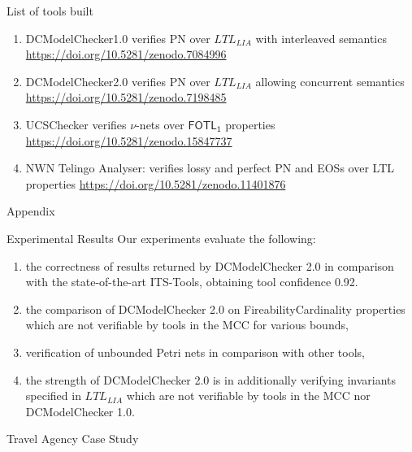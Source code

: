\documentclass [serif,professionalfont]{beamer}
\newcommand{\LC}{$LTL_{LIA}$}
\newcommand{\Lstar}{$\mathsf{FOTL_1}$}
\begin{document}
\begin{frame}{List of tools built}
    \begin{enumerate}
        \item[1] DCModelChecker1.0 verifies PN over {\LC} with interleaved semantics \url{https://doi.org/10.5281/zenodo.7084996}
        \item[2] DCModelChecker2.0 verifies PN over {\LC} allowing concurrent semantics \url{https://doi.org/10.5281/zenodo.7198485}
        \item[3] UCSChecker verifies $\nu$-nets over {\Lstar} properties \url{https://doi.org/10.5281/zenodo.15847737}
        \item[4] NWN Telingo Analyser: verifies lossy and perfect PN and EOSs over LTL properties \url{https://doi.org/10.5281/zenodo.11401876}
    \end{enumerate}

\end{frame}
\appendix
\begin{frame}
    \centering
    \huge{Appendix}
\end{frame}

\begin{frame}{Experimental Results}
    Our experiments evaluate the following:
    \begin{enumerate}
        \item  the correctness of results returned by DCModelChecker 2.0 in comparison with the state-of-the-art ITS-Tools, obtaining tool confidence 0.92.
        \item  the comparison of DCModelChecker 2.0 on FireabilityCardinality properties which are not verifiable by tools in the MCC for various bounds,
        \item verification of unbounded Petri nets in comparison with other tools,
        \item the strength of DCModelChecker 2.0 is in additionally verifying invariants specified in {\LC} which are not verifiable by tools in the MCC nor DCModelChecker 1.0.
    \end{enumerate}
\end{frame}


\begin{frame}{\tiny Travel Agency Case Study}
    \begin{figure}
        \centering
        \scalebox{0.3}{}
    \end{figure}
\end{frame}
\end{document}
